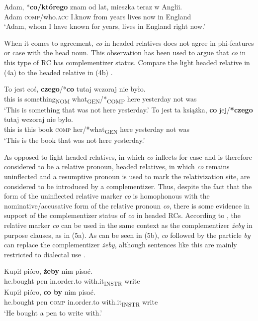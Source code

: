 \documentclass[output=paper]{langsci/langscibook}
\begin{document}
\ea%
    \label{ex:leska:3}
    \gll Adam, *\textbf{co/którego} znam od lat, mieszka teraz w Anglii.    \\
         Adam \textsc{comp}/who\textsc{.acc} I.know from years lives now in England\\
    \glt ‘Adam, whom I have known for years, lives in England right now.’
    \z


When it comes to agreement, \textit{co} in headed relatives does not agree in phi-features or case with the head noun. This observation has been used to argue that \textit{co} in this type of RC has complementizer status. Compare the light headed relative in (4a) to the headed relative in (4b) \citep{Citko2004}.

\ea%
    \label{ex:leska:4}
    \ea
    \gll To   jest   coś,   \textbf{czego}/*\textbf{co}   tutaj  wczoraj    nie   było.   \\
         this   is   something\textsubscript{NOM}   what\textsubscript{GEN}/*\textsubscript{COMP}  here  yesterday  not   was\\
    \glt ‘This is something that was not here yesterday.’
    \ex
    \gll To   jest   ta   książka,   \textbf{co}   jej/\textbf{*czego}   tutaj  wczoraj   nie  było.        \\
         this   is   this   book   \textsc{comp}   her/*what\textsubscript{GEN}   here   yesterday  not  was\\
    \glt ‘This is the book that was not here yesterday.’
    \z
\z

As opposed to light headed relatives, in which \textit{co} inflects for case and is therefore considered to be a relative pronoun, headed relatives, in which \textit{co} remains uninflected and a resumptive pronoun is used to mark the relativization site, are considered to be introduced by a complementizer. Thus, despite the fact that the form of the uninflected relative marker \textit{co} is homophonous with the nominative/accusative form of the relative pronoun \textit{co}, there is some evidence in support of the complementizer status of \textit{co} in headed RCs. According to \citet{Bondaruk1995}, the relative marker \textit{co} can be used in the same context as the complementizer \textit{żeby} in purpose clauses, as in (5a). As can be seen in (5b), \textit{co} followed by the particle \textit{by} can replace the complementizer \textit{żeby}, although sentences like this are mainly restricted to dialectal use \citep[35]{Bondaruk1995}.

\ea%
    \label{ex:leska:5}
    \ea
    \gll Kupił   pióro,  \textbf{żeby} nim   pisać.\\
         he.bought   pen   in.order.to   with.it\textsubscript{INSTR}  write\\
    \ex
    \gll Kupił   pióro,   \textbf{co   by}   nim   pisać.\\
         he.bought   pen   \textsc{comp} in.order.to   with.it\textsubscript{INSTR}  write\\
    \glt ‘He bought a pen to write with.’
    \z
\z
\end{document}

